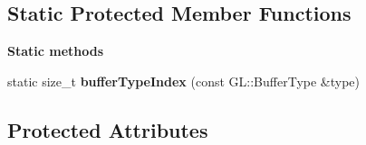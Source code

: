 \subsection*{Static Protected Member Functions}
\begin{Indent}\textbf{ Static methods}\par
\begin{DoxyCompactItemize}
\item 
\mbox{\label{classrev_1_1_render_context_acec3f0cc88ad074544f89782882a31c9}} 
static size\+\_\+t {\bfseries buffer\+Type\+Index} (const G\+L\+::\+Buffer\+Type \&type)
\end{DoxyCompactItemize}
\end{Indent}
\subsection*{Protected Attributes}

